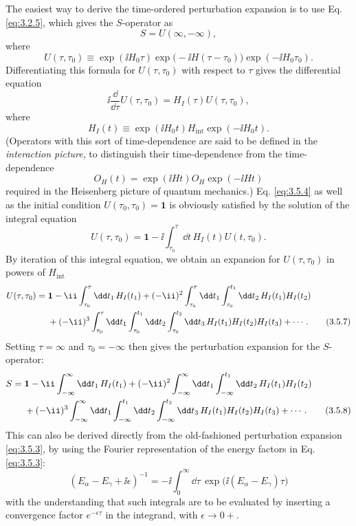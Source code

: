The easiest way to derive the time-ordered perturbation expansion is to use Eq. \eqref{eq:3.2.5}, which
gives the $S$-operator as
\[
 S=U(\infty,-\infty),
\]
where
\[
 U(\tau,\tau_0)\equiv
 \exp(\ii H_0\tau)\exp\bigl(-\ii H(\tau-\tau_0)\bigr)\exp(-\ii H_0\tau_0).
\]
Differentiating this formula for $U(\tau,\tau_0)$ with respect to $\tau$ gives the differential
equation
\begin{equation}
 \ii\frac{\dd}{\dd\tau}U(\tau,\tau_0)=H_I(\tau)U(\tau,\tau_0),
 \tag{3.5.4}\label{eq:3.5.4}
\end{equation}
where
\begin{equation}
 H_I(t)\equiv\exp(\ii H_0t)H_{\mathrm{int}}\exp(-\ii H_0t).
 \tag{3.5.5}\label{eq:3.5.5}
\end{equation}
(Operators with this sort of time-dependence are said to be defined in the \emph{interaction
picture}, to distinguish their time-dependence from the time-dependence
\[
 O_H(t)=\exp(\ii Ht)O_H\exp(-\ii Ht)
\]
required in the Heisenberg picture of quantum mechanics.)
Eq. \eqref{eq:3.5.4} as well as the initial condition $U(\tau_0,\tau_0)=\mathbf{1}$ is obviously satisfied
by the solution of the integral equation
\begin{equation}
 U(\tau,\tau_0)=\mathbf{1}-\ii\int_{\tau_0}^{\tau}\dd t\,H_I(t)U(t,\tau_0).
 \tag{3.5.6}\label{eq:3.5.6}
\end{equation}
By iteration of this integral equation, we obtain an expansion for $U(\tau,\tau_0)$ in powers
of $H_{\mathrm{int}}$
\begin{align}
 U(\tau,\tau_0)={}&\mathbf{1}-\ii\int_{\tau_0}^{\tau}\dd t_1\,H_I(t_1)
 +(-\ii)^2\int_{\tau_0}^{\tau}\dd t_1\int_{\tau_0}^{t_1}\dd t_2\,H_I(t_1)H_I(t_2)\notag\\
 &+(-\ii)^3\int_{\tau_0}^{\tau}\dd t_1\int_{\tau_0}^{t_1}\dd t_2
 \int_{\tau_0}^{t_2}\dd t_3\,H_I(t_1)H_I(t_2)H_I(t_3)+\cdots.
 \tag{3.5.7}\label{eq:3.5.7}
\end{align}
Setting $\tau=\infty$ and $\tau_0=-\infty$ then gives the perturbation expansion for the
$S$-operator:
\begin{align}
 S={}&\mathbf{1}-\ii\int_{-\infty}^{\infty}\dd t_1\,H_I(t_1)
 +(-\ii)^2\int_{-\infty}^{\infty}\dd t_1\int_{-\infty}^{t_1}\dd t_2\,H_I(t_1)H_I(t_2)\notag\\
 &+(-\ii)^3\int_{-\infty}^{\infty}\dd t_1\int_{-\infty}^{t_1}\dd t_2
 \int_{-\infty}^{t_2}\dd t_3\,H_I(t_1)H_I(t_2)H_I(t_3)+\cdots.
 \tag{3.5.8}\label{eq:3.5.8}
\end{align}
This can also be derived directly from the old-fashioned perturbation expansion \eqref{eq:3.5.3}, by
using the Fourier representation of the energy factors in Eq. \eqref{eq:3.5.3}:
\begin{equation}
 (E_\alpha-E_\gamma+\ii\epsilon)^{-1}
 =-\ii\int_0^\infty \dd\tau\,\exp\bigl(\ii(E_\alpha-E_\gamma)\tau\bigr)
 \tag{3.5.9}\label{eq:3.5.9}
\end{equation}
with the understanding that such integrals are to be evaluated by inserting a convergence
factor $e^{-\epsilon\tau}$ in the integrand, with $\epsilon\to0+$.

